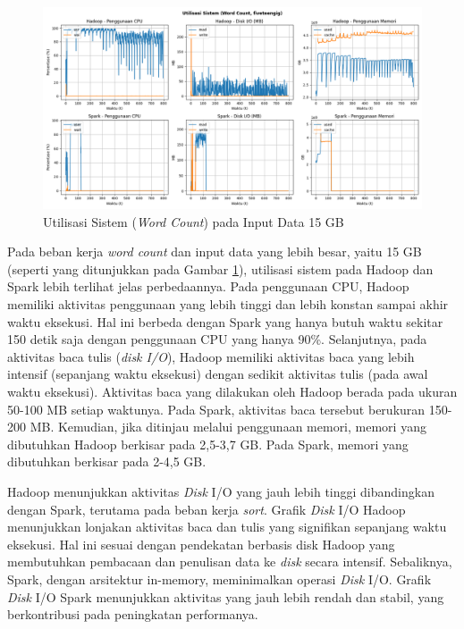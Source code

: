 \begin{figure}[h]
    \centering
    \includegraphics[width=1\textwidth]{figures/ch04/5-util-sistem-wordcount-fiveteengig}
    \caption{Utilisasi Sistem (\textit{Word Count}) pada Input Data 15 GB}
    \label{fig:5-util-sistem-wordcount-fiveteengig}
\end{figure}

Pada beban kerja \textit{word count} dan input data yang lebih besar, yaitu 15 GB (seperti yang ditunjukkan pada Gambar \ref{fig:5-util-sistem-wordcount-fiveteengig}), utilisasi sistem pada Hadoop dan Spark lebih terlihat jelas perbedaannya. Pada penggunaan CPU, Hadoop memiliki aktivitas penggunaan yang lebih tinggi dan lebih konstan sampai akhir waktu eksekusi. Hal ini berbeda dengan Spark yang hanya butuh waktu sekitar 150 detik saja dengan penggunaan CPU yang hanya 90\%. Selanjutnya, pada aktivitas baca tulis (\textit{disk I/O}), Hadoop memiliki aktivitas baca yang lebih intensif (sepanjang waktu eksekusi) dengan sedikit aktivitas tulis (pada awal waktu eksekusi). Aktivitas baca yang dilakukan oleh Hadoop berada pada ukuran 50-100 MB setiap waktunya. Pada Spark, aktivitas baca tersebut berukuran 150-200 MB. Kemudian, jika ditinjau melalui penggunaan memori, memori yang dibutuhkan Hadoop berkisar pada 2,5-3,7 GB. Pada Spark, memori yang dibutuhkan berkisar pada 2-4,5 GB.  

Hadoop menunjukkan aktivitas \textit{Disk} I/O yang jauh lebih tinggi dibandingkan dengan Spark, terutama pada beban kerja \textit{sort}. Grafik \textit{Disk} I/O Hadoop menunjukkan lonjakan aktivitas baca dan tulis yang signifikan sepanjang waktu eksekusi. Hal ini sesuai dengan pendekatan berbasis disk Hadoop yang membutuhkan pembacaan dan penulisan data ke \textit{disk} secara intensif. Sebaliknya, Spark, dengan arsitektur in-memory, meminimalkan operasi \textit{Disk} I/O. Grafik \textit{Disk} I/O Spark menunjukkan aktivitas yang jauh lebih rendah dan stabil, yang berkontribusi pada peningkatan performanya.

